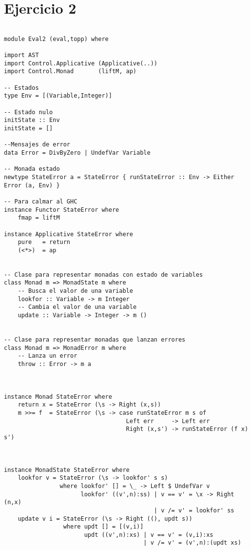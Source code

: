 \documentclass[a4paper]{report}
\begin{document}
\section*{Ejercicio 2}
\begin{lstlisting}

module Eval2 (eval,topp) where

import AST
import Control.Applicative (Applicative(..))
import Control.Monad       (liftM, ap)

-- Estados
type Env = [(Variable,Integer)]

-- Estado nulo
initState :: Env
initState = []

--Mensajes de error
data Error = DivByZero | UndefVar Variable

-- Monada estado
newtype StateError a = StateError { runStateError :: Env -> Either Error (a, Env) }

-- Para calmar al GHC
instance Functor StateError where
    fmap = liftM

instance Applicative StateError where
    pure   = return
    (<*>)  = ap


-- Clase para representar monadas con estado de variables
class Monad m => MonadState m where
    -- Busca el valor de una variable
    lookfor :: Variable -> m Integer
    -- Cambia el valor de una variable
    update :: Variable -> Integer -> m ()


-- Clase para representar monadas que lanzan errores
class Monad m => MonadError m where
    -- Lanza un error
    throw :: Error -> m a



instance Monad StateError where
    return x = StateError (\s -> Right (x,s))
    m >>= f  = StateError (\s -> case runStateError m s of
                                   Left err     -> Left err
                                   Right (x,s') -> runStateError (f x) s')



instance MonadState StateError where
    lookfor v = StateError (\s -> lookfor' s s)
                where lookfor' [] = \_ -> Left $ UndefVar v
                      lookfor' ((v',n):ss) | v == v' = \x -> Right (n,x)
                                           | v /= v' = lookfor' ss
    update v i = StateError (\s -> Right ((), updt s))
                 where updt [] = [(v,i)]
                       updt ((v',n):xs) | v == v' = (v,i):xs
                                        | v /= v' = (v',n):(updt xs)




\end{lstlisting}
\end{document}
